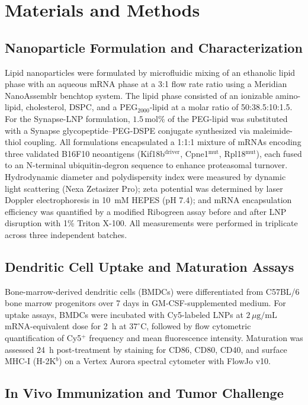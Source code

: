 \section{Materials and Methods}

\subsection{Nanoparticle Formulation and Characterization}

Lipid nanoparticles were formulated by microfluidic mixing of an ethanolic lipid phase with an aqueous mRNA phase at a 3:1 flow rate ratio using a Meridian NanoAssemblr benchtop system. The lipid phase consisted of an ionizable amino-lipid, cholesterol, DSPC, and a PEG$_{2000}$-lipid at a molar ratio of 50:38.5:10:1.5. For the Synapse-LNP formulation, $1.5\,\text{mol}\%$ of the PEG-lipid was substituted with a Synapse glycopeptide--PEG-DSPE conjugate synthesized via maleimide-thiol coupling. All formulations encapsulated a 1:1:1 mixture of mRNAs encoding three validated B16F10 neoantigens (Kif18b$^{\text{driver}}$, Cpne1$^{\text{mut}}$, Rpl18$^{\text{mut}}$), each fused to an N-terminal ubiquitin-degron sequence to enhance proteasomal turnover. Hydrodynamic diameter and polydispersity index were measured by dynamic light scattering (Nexa Zetasizer Pro); zeta potential was determined by laser Doppler electrophoresis in 10~mM HEPES (pH 7.4); and mRNA encapsulation efficiency was quantified by a modified Ribogreen assay before and after LNP disruption with 1\% Triton X-100. All measurements were performed in triplicate across three independent batches.

\subsection{Dendritic Cell Uptake and Maturation Assays}

Bone-marrow-derived dendritic cells (BMDCs) were differentiated from C57BL/6 bone marrow progenitors over 7 days in GM-CSF-supplemented medium. For uptake assays, BMDCs were incubated with Cy5-labeled LNPs at $2\,\mu\text{g/mL}$ mRNA-equivalent dose for 2~h at $37^{\circ}\text{C}$, followed by flow cytometric quantification of Cy5$^{+}$ frequency and mean fluorescence intensity. Maturation was assessed 24~h post-treatment by staining for CD86, CD80, CD40, and surface MHC-I (H-2K$^{b}$) on a Vertex Aurora spectral cytometer with FlowJo v10.

\subsection{In Vivo Immunization and Tumor Challenge}

